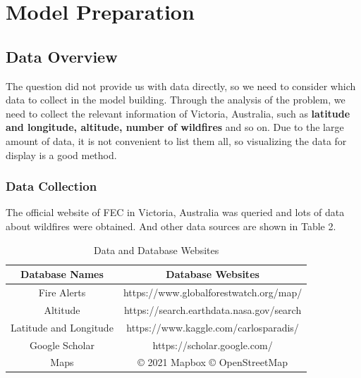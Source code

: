 \documentclass[12pt]{article}  %
\begin{document}
\section{Model Preparation}
\subsection{Data Overview}
The question did not provide us with data directly, so we need to consider which data to collect in the model building. Through the analysis of the problem, we need to collect the relevant information of Victoria, Australia, such as \textbf{latitude and longitude, altitude, number of wildfires} and so on. Due to the large amount of data, it is not convenient to list them all, so visualizing the data for display is a good method.

\subsubsection{Data Collection}
The official website of FEC in Victoria, Australia was queried and lots of data about wildfires were obtained. And other data sources are shown in Table 2.

\begin{table}[htbp]
    \begin{center}
        \caption{Data and Database Websites}
        \resizebox{\textwidth}{!}
        {\begin{tabular}{c c}
                \toprule[2pt]
                \multicolumn{1}{m{5cm}}{\centering \textbf{Database Names}}
                                       & \multicolumn{1}{m{10cm}}{\centering \textbf{Database Websites} } \\ %
                \midrule
                Fire Alerts            & https://www.globalforestwatch.org/map/                           \\
                Altitude               & https://search.earthdata.nasa.gov/search                         \\
                Latitude and Longitude & https://www.kaggle.com/carlosparadis/                            \\ 
                Google Scholar         & https://scholar.google.com/                                      \\
                Maps                   & \copyright{} 2021 Mapbox \copyright{} OpenStreetMap              \\
                \bottomrule[2pt]
            \end{tabular}}
    \end{center}
\end{table}
\end{document}
